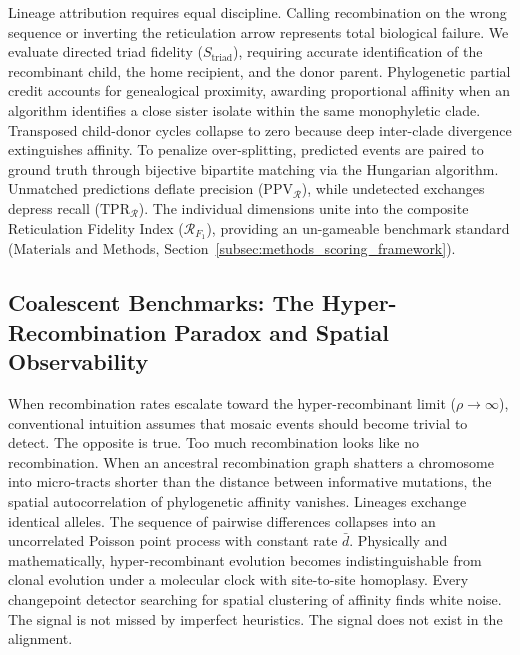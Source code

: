 Lineage attribution requires equal discipline.
Calling recombination on the wrong sequence or inverting the reticulation arrow represents total biological failure.
We evaluate directed triad fidelity ($S_{\text{triad}}$), requiring accurate identification of the recombinant child, the home recipient, and the donor parent.
Phylogenetic partial credit accounts for genealogical proximity, awarding proportional affinity when an algorithm identifies a close sister isolate within the same monophyletic clade.
Transposed child-donor cycles collapse to zero because deep inter-clade divergence extinguishes affinity.
To penalize over-splitting, predicted events are paired to ground truth through bijective bipartite matching via the Hungarian algorithm.
Unmatched predictions deflate precision ($\text{PPV}_{\mathcal{R}}$), while undetected exchanges depress recall ($\text{TPR}_{\mathcal{R}}$).
The individual dimensions unite into the composite Reticulation Fidelity Index ($\mathcal{R}_{F_1}$), providing an un-gameable benchmark standard (Materials and Methods, Section~\ref{subsec:methods_scoring_framework}).

\subsection{Coalescent Benchmarks: The Hyper-Recombination Paradox and Spatial Observability}
\label{subsec:posada_crandall_benchmark}

When recombination rates escalate toward the hyper-recombinant limit ($\rho \to \infty$), conventional intuition assumes that mosaic events should become trivial to detect.
The opposite is true.
Too much recombination looks like no recombination.
When an ancestral recombination graph shatters a chromosome into micro-tracts shorter than the distance between informative mutations, the spatial autocorrelation of phylogenetic affinity vanishes.
Lineages exchange identical alleles.
The sequence of pairwise differences collapses into an uncorrelated Poisson point process with constant rate $\bar{d}$.
Physically and mathematically, hyper-recombinant evolution becomes indistinguishable from clonal evolution under a molecular clock with site-to-site homoplasy.
Every changepoint detector searching for spatial clustering of affinity finds white noise.
The signal is not missed by imperfect heuristics.
The signal does not exist in the alignment.

